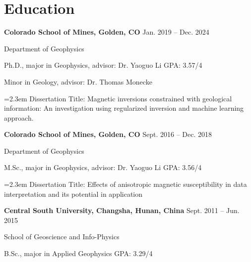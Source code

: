 \documentclass[paper=a4,fontsize=11pt]{scrartcl} %
\newcommand{\sepspace}{\vspace*{0.5em}}		%
\newcommand{\NewPart}[1]{\section*{{#1}}}
\begin{document}
\NewPart{Education}{}
\hspace{2em} \textbf{Colorado School of Mines, Golden, CO} \hspace{17.1em} Jan. 2019 – Dec. 2024

\hspace{1em} Department of Geophysics

\hspace{1em} Ph.D., major in Geophysics, advisor: Dr. Yaoguo Li  \hspace{16.5em} GPA: 3.57/4

\hspace{1.2em}Minor in Geology, advisor: Dr. Thomas Monecke

\noindent\hangindent=2.3em Dissertation Title: Magnetic inversions constrained with geological information: An investigation using regularized inversion and machine learning approach.

\bigskip
\hspace{1em} \textbf{Colorado School of Mines, Golden, CO} \hspace{16.5em} Sept. 2016 – Dec. 2018

\hspace{1em} Department of Geophysics

\hspace{1em} M.Sc., major in Geophysics, advisor: Dr. Yaoguo Li \hspace{16.5em} GPA: 3.56/4

\noindent\hangindent=2.3em Dissertation Title: Effects of anisotropic magnetic susceptibility in data interpretation and its potential in application

\bigskip
\hspace{1em} \textbf{Central South University, Changsha, Hunan, China } \hspace{10.5em} Sept. 2011 – Jun. 2015

\hspace{1em} School of Geoscience and Info-Physics

\hspace{1em} B.Sc., major in Applied Geophysics \hspace{23em} GPA: 3.29/4
\sepspace
\end{document}
